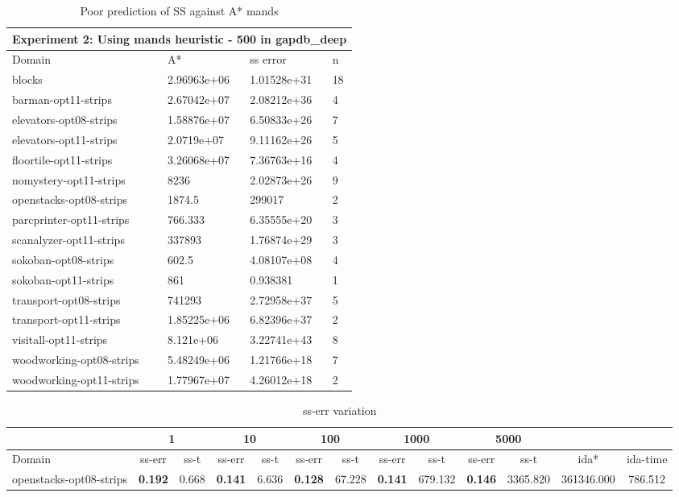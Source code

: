 \documentclass[a4paper,12pt]{article}
\begin{document}
\begin{table}[]
\centering
\caption{Poor prediction of SS against A* mands}
\label{my-label}
\begin{tabular}{l|l|l|l}
\hline
\multicolumn{4}{l}{Experiment 2: Using mands heuristic - 500 in gapdb\_deep} \\ \hline
Domain& A*& ss error& n \\ \hline

blocks& 2.96963e+06& 1.01528e+31& 18\\ \hline
barman-opt11-strips& 2.67042e+07& 2.08212e+36& 4\\ \hline
elevators-opt08-strips& 1.58876e+07& 6.50833e+26& 7\\ \hline
elevators-opt11-strips& 2.0719e+07& 9.11162e+26& 5\\ \hline
floortile-opt11-strips& 3.26068e+07& 7.36763e+16& 4\\ \hline
nomystery-opt11-strips& 8236& 2.02873e+26& 9\\ \hline
openstacks-opt08-strips& 1874.5& 299017& 2\\ \hline
parcprinter-opt11-strips& 766.333& 6.35555e+20& 3\\ \hline
scanalyzer-opt11-strips& 337893& 1.76874e+29& 3\\ \hline
sokoban-opt08-strips& 602.5& 4.08107e+08& 4\\ \hline
sokoban-opt11-strips& 861& 0.938381& 1\\ \hline
transport-opt08-strips& 741293& 2.72958e+37& 5\\ \hline
transport-opt11-strips& 1.85225e+06& 6.82396e+37& 2\\ \hline
visitall-opt11-strips& 8.121e+06& 3.22741e+43& 8\\ \hline
woodworking-opt08-strips& 5.48249e+06& 1.21766e+18& 7\\ \hline
woodworking-opt11-strips& 1.77967e+07& 4.26012e+18& 2\\ \hline
\end{tabular}
\end{table}



\iffalse

\begin{table}[]
\footnotesize\setlength{\tabcolsep}{2.0pt}
\caption{ss-err variation}
\label{subTable1}
\begin{tabular}{l@{\hspace{6pt}} *{12}{c}}
\hline
                        & \multicolumn{2}{c|}{1} & \multicolumn{2}{c|}{10} & \multicolumn{2}{c|}{100} & \multicolumn{2}{c|}{1000} & \multicolumn{2}{c|}{5000} &            &          \\ \hline
Domain                  & ss-err        & ss-t   & ss-err        & ss-t    & ss-err        & ss-t     & ss-err        & ss-t      & ss-err        & ss-t      & ida*       & ida-time \\ \hline
openstacks-opt08-strips & {\bf 0.192}   & 0.668  & {\bf 0.141}   & 6.636   & {\bf 0.128}   & 67.228   & {\bf 0.141}   & 679.132   & {\bf 0.146}   & 3365.820  & 361346.000 & 786.512  \\ \hline
\end{tabular}
\end{table}
\end{document}
